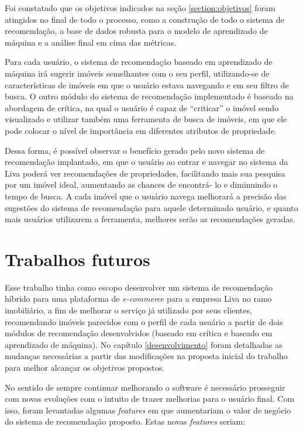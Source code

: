 Foi constatado que os objetivos indicados na seção \ref{section:objetivos} foram atingidos no final de todo o processo, como a construção de todo o sistema de recomendação, a base de dados robusta para o modelo de aprendizado de máquina e a análise final em cima das métricas.

Para cada usuário, o sistema de recomendação baseado em aprendizado de máquina irá sugerir imóveis semelhantes com o seu perfil, utilizando-se de características de imóveis em que o usuário estava navegando e em seu filtro de busca. O outro módulo do sistema de recomendação implementado é baseado na abordagem de crítica, na qual o usuário é capaz de “criticar'' o imóvel sendo visualizado e utilizar também uma ferramenta de busca de imóveis, em que ele pode colocar o nível de importância em diferentes atributos de propriedade.

Dessa forma, é possível observar o benefício gerado pelo novo  sistema de recomendação implantado, em que o usuário ao entrar e navegar no sistema da Liva poderá ver recomendações de propriedades, facilitando mais sua pesquisa por um imóvel ideal, aumentando as chances de encontrá- lo e diminuindo o tempo de busca. A cada imóvel que o usuário navega melhorará a precisão das sugestões do sistema de recomendação para aquele determinado usuário, e quanto mais usuários utilizarem a ferramenta, melhores serão as recomendações geradas.

\section{Trabalhos futuros}

Esse trabalho tinha como escopo desenvolver um sistema de recomendação híbrido para uma plataforma de \textit{e-commerce} para a empresa Liva no ramo imobiliário, a fim de melhorar o serviço já utilizado por seus clientes, recomendando imóveis parecidos com o perfil de cada usuário a partir de dois módulos de recomendação desenvolvidos (baseado em crítica e baseado em aprendizado de máquina). No capítulo \ref{desenvolvimento} foram detalhadas as mudanças necessárias a partir das modificações na proposta inicial do trabalho para melhor alcançar os objetivos propostos.

No sentido de sempre continuar melhorando o software é necessário prosseguir com novas evoluções com o intuito de trazer melhorias para o usuário final. Com isso, foram levantadas algumas \textit{features} em que aumentariam o valor de negócio do sistema de recomendação proposto. Estas novas \textit{features} seriam:

